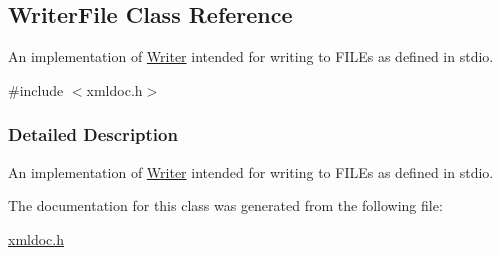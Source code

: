 \hypertarget{classWriterFile}{
\subsection{WriterFile Class Reference}
\label{classWriterFile}
}


An implementation of \hyperlink{classWriter}{Writer} intended for writing to FILEs as defined in stdio.  




{\ttfamily \#include $<$xmldoc.h$>$}



\subsubsection{Detailed Description}
An implementation of \hyperlink{classWriter}{Writer} intended for writing to FILEs as defined in stdio. 

The documentation for this class was generated from the following file:\begin{DoxyCompactItemize}
\item 
\hyperlink{xmldoc_8h}{xmldoc.h}\end{DoxyCompactItemize}
